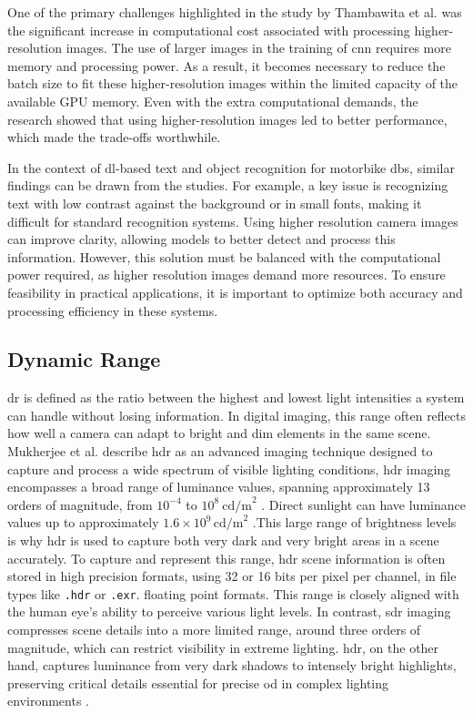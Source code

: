 One of the primary challenges highlighted in the study by Thambawita et al. \cite{RES_IMP} was the significant increase in computational cost associated with processing higher-resolution images. The use of larger images in the training of \gls{cnn} requires more memory and processing power. As a result, it becomes necessary to reduce the batch size to fit these higher-resolution images within the limited capacity of the available GPU memory. Even with the extra computational demands, the research showed that using higher-resolution images led to better performance, which made the trade-offs worthwhile.

In the context of \gls{dl}-based text and object recognition for motorbike \gls{db}s, similar findings can be drawn from the studies. For example, a key issue is recognizing text with low contrast against the background or in small fonts, making it difficult for standard recognition systems. Using higher resolution camera images can improve clarity, allowing models to better detect and process this information. However, this solution must be balanced with the computational power required, as higher resolution images demand more resources. To ensure feasibility in practical applications, it is important to optimize both accuracy and processing efficiency in these systems.

\subsection{Dynamic Range}
\gls{dr}  is defined as the ratio between the highest and lowest light intensities a system can handle without losing information. In digital imaging, this range often reflects how well a camera can adapt to bright and dim elements in the same scene. Mukherjee et al. describe \gls{hdr} as an advanced imaging technique designed to capture and process a wide spectrum of visible lighting conditions, \gls{hdr} imaging encompasses a broad range of luminance values, spanning approximately 13 orders of magnitude, from \( 10^{-4} \) to \( 10^8 \ \text{cd/m}^2 \) \cite{HDR}. Direct sunlight can have luminance values up to approximately \( 1.6 \times 10^9 \, \text{cd/m}^2 \) \cite{sunlight_lum}.This large range of brightness levels is why \gls{hdr} is used to capture both very dark and very bright areas in a scene accurately. To capture and represent this range, \gls{hdr} scene information is often stored in high precision formats, using 32 or 16 bits per pixel per channel, in file types like \texttt{.hdr} or \texttt{.exr}. floating point formats. This range is closely aligned with the human eye’s ability to perceive various light levels. In contrast, \gls{sdr} imaging compresses scene details into a more limited range, around three orders of magnitude, which can restrict visibility in extreme lighting. \gls{hdr}, on the other hand, captures luminance from very dark shadows to intensely bright highlights, preserving critical details essential for precise \gls{od} in complex lighting environments \cite{HDR}.

